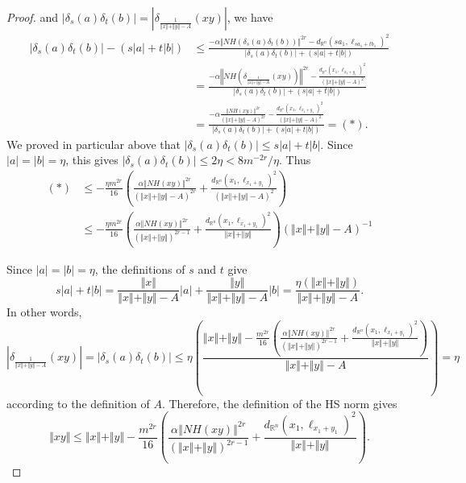 \documentclass[11pt]{amsart}
\theoremstyle{definition}
\numberwithin{theorem}{section} \numberwithin{equation}{section}
\begin{document}
\begin{proof}
and $\left| \delta_{s} \left( a \right) \delta_{t} \left( b \right) \right| = \left| \delta_{\frac{1}{\Vert x \Vert + \Vert y \Vert - A}}(xy) \right|$,
we have
\begin{align*}
|\delta_s (a) \delta_{t}(b)| - (s|a| + t|b|) 
&\leq \frac{-\alpha \Vert NH(\delta_{s}(a)\delta_{t}(b)) \Vert^{2r} - d_{\mathbb{R}^n}(sa_1,\ell_{sa_1+tb_1})^2}
{|\delta_s (a) \delta_t(b)| + (s|a| + t|b|)}\\
&=\frac{-  \alpha \left\Vert NH\left( \delta_{\frac{1}{\Vert x \Vert + \Vert y \Vert  - A}}(xy) \right) \right\Vert^{2r}
- \frac{d_{\mathbb{R}^n}(x_1,\ell_{x_1+y_1})^2 }{(\Vert x \Vert + \Vert y \Vert  - A)^2} }
{\left| \delta_s (a) \delta_{t}(b) \right| + (s|a| + t|b|)} \\
&=\frac{-  \alpha \frac{\left\Vert NH\left( xy \right) \right\Vert^{2r}}{(\Vert x \Vert + \Vert y \Vert - A)^{2r}}  
- \frac{d_{\mathbb{R}^n}(x_1,\ell_{x_1+y_1})^2 }{(\Vert x \Vert + \Vert y \Vert  - A)^2} }
{\left| \delta_s (a) \delta_{t}(b) \right| + (s|a| + t|b|)} = (*).
\end{align*}
We proved in particular above
that $| \delta_s (a) \delta_{t}(b) | \leq s|a|+t|b|$.
Since $|a|=|b|=\eta$, this gives $| \delta_s (a) \delta_{t}(b) | \leq 2\eta < 8 m^{-2r} / \eta$.
Thus
\begin{align*}
(*)
&\leq -\frac{\eta m^{2r}}{16 } \left(   \frac{\alpha \left\Vert NH\left( xy \right) \right\Vert^{2r}}{(\Vert x \Vert + \Vert y \Vert -A)^{2r}}  
+ \frac{d_{\mathbb{R}^n}(x_1,\ell_{x_1+y_1})^2 }{(\Vert x \Vert + \Vert y \Vert  -A)^2} \right) \\
&\leq -\frac{\eta m^{2r}}{16} \left(   \frac{\alpha \left\Vert NH\left( xy \right) \right\Vert^{2r}}{(\Vert x \Vert + \Vert y \Vert )^{2r-1}}  
+ \frac{d_{\mathbb{R}^n}(x_1,\ell_{x_1+y_1})^2 }{\Vert x \Vert + \Vert y \Vert  } \right) (\Vert x \Vert + \Vert y \Vert  -A)^{-1}
\end{align*}

Since $|a|=|b|=\eta$, the definitions of $s$ and $t$ give
$$
s|a| + t|b| 
= \frac{\Vert x \Vert}{\Vert x \Vert + \Vert y \Vert  - A}|a| + \frac{\Vert y \Vert}{\Vert x \Vert + \Vert y \Vert  - A} |b|
= \frac{\eta(\Vert x \Vert + \Vert y \Vert)}{\Vert x \Vert + \Vert y \Vert - A}.
$$
In other words,
$$
\left| \delta_{\frac{1}{\Vert x \Vert + \Vert y \Vert - A}}(xy) \right|
=
|\delta_s (a) \delta_{t}(b)| 
\leq
\eta \left( \frac{ \Vert x \Vert + \Vert y \Vert 
- \frac{m^{2r}}{16} \left( \frac{\alpha \left\Vert NH\left( xy \right) \right\Vert^{2r}}{(\Vert x \Vert + \Vert y \Vert)^{2r-1}} + \frac{d_{\mathbb{R}^n}(x_1,\ell_{x_1+y_1})^2 }{\Vert x \Vert + \Vert y \Vert} \right)}
{\Vert x \Vert + \Vert y \Vert-A} \right)
= \eta
$$
according to the definition of $A$.
Therefore, the definition of the HS norm gives
$$
\Vert xy \Vert \leq \Vert x \Vert + \Vert y \Vert 
- \frac{m^{2r}}{16} \left( \frac{\alpha \left\Vert NH\left( xy \right) \right\Vert^{2r}}{(\Vert x \Vert + \Vert y \Vert)^{2r-1}} + \frac{d_{\mathbb{R}^n}(x_1,\ell_{x_1+y_1})^2 }{\Vert x \Vert + \Vert y \Vert} \right).
$$

\end{proof}
\end{document}
